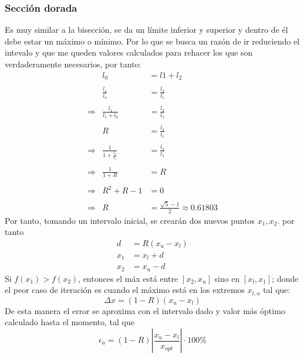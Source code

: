 \documentclass[letterpaper, 12pt, twoside]{article}
\begin{document}
	\subsubsection{Sección dorada}
	Es muy similar a la bisección, se da un límite inferior y superior y dentro de él debe estar un máximo o mínimo. Por lo que se busca un razón de ir reduciendo el intevalo y que me queden valores calculados para rehacer los que son verdaderamente necesarios, por tanto:
	\begin{eqnarray*}
		&l_0 &= l1 +l_2\\\\
		 &\frac{l_1}{l_o} &= \frac{l_2}{l_1}\\\\
		 \Rightarrow &\frac{l_1}{l_1+l_2} &= \frac{l_2}{l_1}\\\\
		 & R &= \frac{l_2}{l_1}\\\\
		\Rightarrow &\frac{1}{1+\frac{l_2}{l_1}} &= \frac{l_2}{l_1}\\\\
		\Rightarrow &\frac{1}{1+R} &= R\\\\
		\Rightarrow &R^2+R-1 &=0\\\\
		\Rightarrow &R &= \frac{\sqrt{5}-1}{2} \approx 0.61803
	\end{eqnarray*}
	Por tanto, tomando un intervalo inicial, se crearán dos nuevos puntos $x_1, x_2$. por tanto
	\begin{eqnarray*}
		d &= R(x_u-x_l)\\
		x_1 &= x_l+d\\
		x_2 &= x_u-d
	\end{eqnarray*}
	Si $f(x_1)>f(x_2)$, entonces el máx está entre $[x_2,x_u]$ sino en $[x_l,x_1]$; donde el peor caso de iteración es cuando el máximo está en los extremos $x_{l,u}$ tal que: $$\Delta x = (1-R)(x_u-x_l)$$ De esta manera el error se aproxima con el intervalo dado y valor más óptimo calculado hasta el momento, tal que $$\epsilon_a = (1-R)\left|\frac{x_u-x_l}{x_{opt}}\right|\cdot 100\si{\percent}$$
\end{document}
